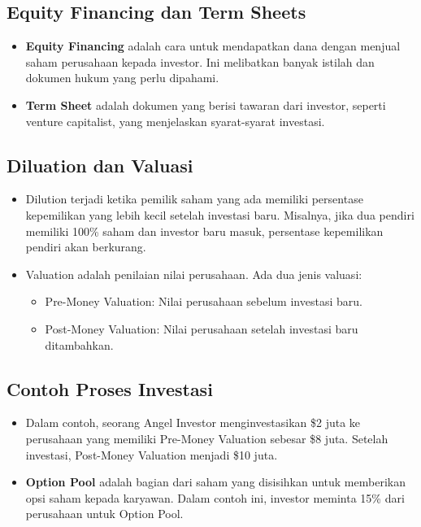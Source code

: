 \documentclass{article}
\begin{document}
\subsection{Equity Financing dan Term Sheets}
\begin{itemize}
    \item \textbf{Equity Financing} adalah cara untuk mendapatkan dana dengan menjual saham perusahaan kepada investor. Ini melibatkan banyak istilah dan dokumen hukum yang perlu dipahami.
    \item \textbf{Term Sheet} adalah dokumen yang berisi tawaran dari investor, seperti venture capitalist, yang menjelaskan syarat-syarat investasi.
\end{itemize}

\subsection{Diluation dan Valuasi}
\begin{itemize}
    \item Dilution terjadi ketika pemilik saham yang ada memiliki persentase kepemilikan yang lebih kecil setelah investasi baru. Misalnya, jika dua pendiri memiliki 100\% saham dan investor baru masuk, persentase kepemilikan pendiri akan berkurang.
    \item Valuation adalah penilaian nilai perusahaan. Ada dua jenis valuasi:
          \begin{itemize}
              \item Pre-Money Valuation: Nilai perusahaan sebelum investasi baru.
              \item Post-Money Valuation: Nilai perusahaan setelah investasi baru ditambahkan.
          \end{itemize}
\end{itemize}

\subsection{Contoh Proses Investasi}
\begin{itemize}
    \item Dalam contoh, seorang Angel Investor menginvestasikan \$2 juta ke perusahaan yang memiliki Pre-Money Valuation sebesar \$8 juta. Setelah investasi, Post-Money Valuation menjadi \$10 juta.
    \item \textbf{Option Pool} adalah bagian dari saham yang disisihkan untuk memberikan opsi saham kepada karyawan. Dalam contoh ini, investor meminta 15\% dari perusahaan untuk Option Pool.
\end{itemize}
\end{document}
